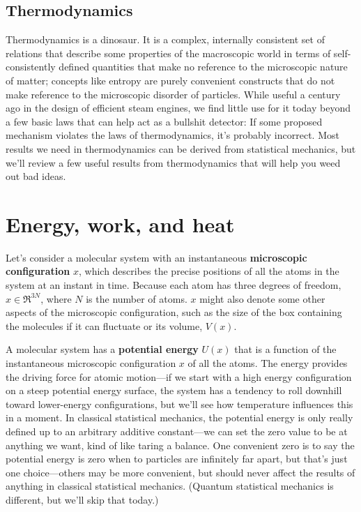 \documentclass[english,course]{lecture}
\begin{document}

\subsection{Thermodynamics}

Thermodynamics is a dinosaur.
It is a complex, internally consistent set of relations that describe some properties of the macroscopic world in terms of self-consistently defined quantities that make no reference to the microscopic nature of matter; concepts like entropy are purely convenient constructs that do not make reference to the microscopic disorder of particles.
While useful a century ago in the design of efficient steam engines, we find little use for it today beyond a few basic laws that can help act as a bullshit detector: If some proposed mechanism violates the laws of thermodynamics, it's probably incorrect.
Most results we need in thermodynamics can be derived from statistical mechanics, but we'll review a few useful results from thermodynamics that will help you weed out bad ideas.


\section{Energy, work, and heat}

Let's consider a molecular system with an instantaneous {\bf microscopic configuration} $x$, which describes the precise positions of all the atoms in the system at an instant in time.
Because each atom has three degrees of freedom, $x \in \Re^{3N}$, where $N$ is the number of atoms.
$x$ might also denote some other aspects of the microscopic configuration, such as the size of the box containing the molecules if it can fluctuate or its volume, $V(x)$.

A molecular system has a {\bf potential energy} $U(x)$ that is a function of the instantaneous microscopic configuration $x$ of all the atoms.
The energy provides the driving force for atomic motion---if we start with a high energy configuration on a steep potential energy surface, the system has a tendency to roll downhill toward lower-energy configurations, but we'll see how temperature influences this in a moment.
In classical statistical mechanics, the potential energy is only really defined up to an arbitrary additive constant---we can set the zero value to be at anything we want, kind of like taring a balance. 
One convenient zero is to say the potential energy is zero when to particles are infinitely far apart, but that's just one choice---others may be more convenient, but should never affect the results of anything in classical statistical mechanics. 
(Quantum statistical mechanics is different, but we'll skip that today.)
\end{document}
